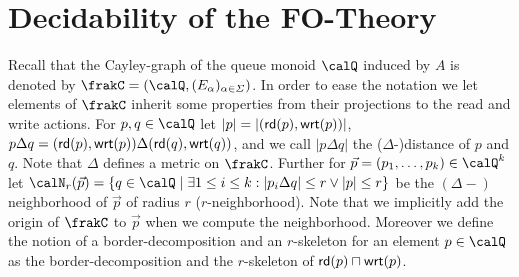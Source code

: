 \section{Decidability of the FO-Theory}\label{sec:decidability}
Recall that the Cayley-graph of the queue monoid $\Qx$ induced by $A$ is denoted by $\frakC=(\Qx,(E_\alpha)_{\alpha\in\Sigma})$.
In order to ease the notation we let elements of $\frakC$ inherit some properties from their projections to the read and write actions. 
For $p,q\in \Qx$ let $|p| = |(\mathsf{rd}(p), \mathsf{wrt}(p))|$, $p\Delta q = (\mathsf{rd}(p), \mathsf{wrt}(p))\Delta (\mathsf{rd}(q), \mathsf{wrt}(q))$, and we call $|p\Delta q|$ the ($\Delta$-)distance of $p$ and $q$. Note that $\Delta$ defines a metric on $\frakC$. Further for $\vec{p} = (p_1,\ldots,p_k)\in \Qx^k$ let 
$\calN_r(\vec{p}) = \{ q\in \Qx \mid \exists 1\leq i \leq k: |p_i\Delta q| \leq  r  \vee  |p| \leq r \}$ be the $(\Delta-)$neighborhood of $\vec{p}$ of radius $r$ ($r$-neighborhood). Note that we implicitly add the origin
of $\frakC$ to $\vec{p}$ when we compute the neighborhood. Moreover we define the notion of a border-decomposition and an $r$-skeleton for an element $p\in\Qx$ as the border-decomposition and the $r$-skeleton of $\mathsf{rd}(p) \sqcap \mathsf{wrt}(p)$.


